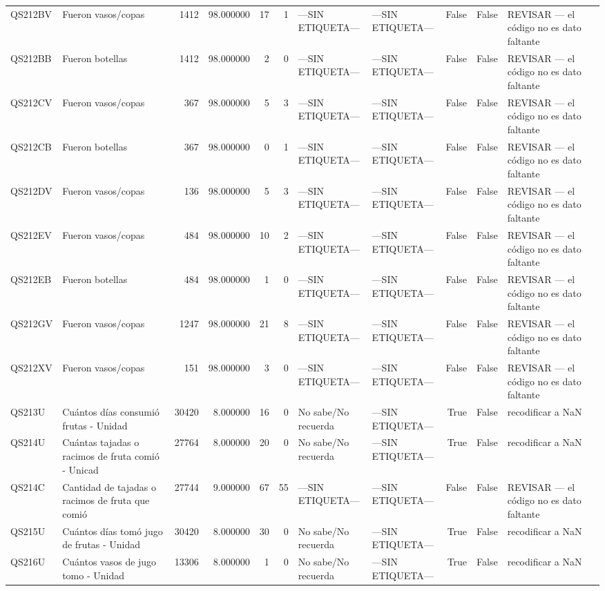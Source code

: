 \begin{longtable}{llrrrrllrrl}
QS212BV & Fueron vasos/copas & 1412 & 98.000000 & 17 & 1 & —SIN ETIQUETA— & —SIN ETIQUETA— & False & False & REVISAR — el código no es dato faltante \\
QS212BB & Fueron botellas & 1412 & 98.000000 & 2 & 0 & —SIN ETIQUETA— & —SIN ETIQUETA— & False & False & REVISAR — el código no es dato faltante \\
QS212CV & Fueron vasos/copas & 367 & 98.000000 & 5 & 3 & —SIN ETIQUETA— & —SIN ETIQUETA— & False & False & REVISAR — el código no es dato faltante \\
QS212CB & Fueron botellas & 367 & 98.000000 & 0 & 1 & —SIN ETIQUETA— & —SIN ETIQUETA— & False & False & REVISAR — el código no es dato faltante \\
QS212DV & Fueron vasos/copas & 136 & 98.000000 & 5 & 3 & —SIN ETIQUETA— & —SIN ETIQUETA— & False & False & REVISAR — el código no es dato faltante \\
QS212EV & Fueron vasos/copas & 484 & 98.000000 & 10 & 2 & —SIN ETIQUETA— & —SIN ETIQUETA— & False & False & REVISAR — el código no es dato faltante \\
QS212EB & Fueron botellas & 484 & 98.000000 & 1 & 0 & —SIN ETIQUETA— & —SIN ETIQUETA— & False & False & REVISAR — el código no es dato faltante \\
QS212GV & Fueron vasos/copas & 1247 & 98.000000 & 21 & 8 & —SIN ETIQUETA— & —SIN ETIQUETA— & False & False & REVISAR — el código no es dato faltante \\
QS212XV & Fueron vasos/copas & 151 & 98.000000 & 3 & 0 & —SIN ETIQUETA— & —SIN ETIQUETA— & False & False & REVISAR — el código no es dato faltante \\
QS213U & Cuántos días consumió frutas - Unidad & 30420 & 8.000000 & 16 & 0 & No sabe/No recuerda & —SIN ETIQUETA— & True & False & recodificar a NaN \\
QS214U & Cuántas tajadas o racimos de fruta comió - Unicad & 27764 & 8.000000 & 20 & 0 & No sabe/No recuerda & —SIN ETIQUETA— & True & False & recodificar a NaN \\
QS214C & Cantidad de tajadas o racimos de fruta que comió & 27744 & 9.000000 & 67 & 55 & —SIN ETIQUETA— & —SIN ETIQUETA— & False & False & REVISAR — el código no es dato faltante \\
QS215U & Cuántos días tomó jugo de frutas - Unidad & 30420 & 8.000000 & 30 & 0 & No sabe/No recuerda & —SIN ETIQUETA— & True & False & recodificar a NaN \\
QS216U & Cuántos vasos de jugo tomo - Unidad & 13306 & 8.000000 & 1 & 0 & No sabe/No recuerda & —SIN ETIQUETA— & True & False & recodificar a NaN \\

\end{longtable}
